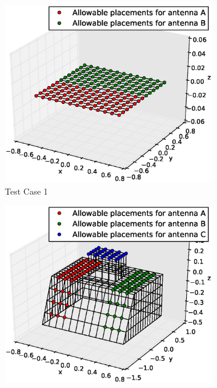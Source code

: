 \documentclass[conference]{IEEEtran}
\begin{document}
\begin{figure}
    \centering
    \begin{subfigure}{.5\columnwidth}
        \includegraphics[width=\columnwidth,height=\columnwidth]{FIG/tc1_figure}%
        \caption{Test Case 1}%
    \label{fig:tc1_figure}%
    \end{subfigure}\hfill%
    \begin{subfigure}{.5\columnwidth}
        \includegraphics[width=\columnwidth, height=\columnwidth]{FIG/tc2_figure}%

\end{subfigure}
\end{figure}
\end{document}
